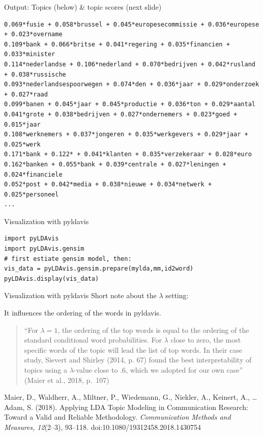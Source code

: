 \documentclass{beamer}
\begin{document}
\begin{frame}[fragile]{Output: Topics (below) \& topic scores (next slide)}
\begin{lstlisting}
0.069*fusie + 0.058*brussel + 0.045*europesecommissie + 0.036*europese + 0.023*overname
0.109*bank + 0.066*britse + 0.041*regering + 0.035*financien + 0.033*minister
0.114*nederlandse + 0.106*nederland + 0.070*bedrijven + 0.042*rusland + 0.038*russische
0.093*nederlandsespoorwegen + 0.074*den + 0.036*jaar + 0.029*onderzoek + 0.027*raad
0.099*banen + 0.045*jaar + 0.045*productie + 0.036*ton + 0.029*aantal
0.041*grote + 0.038*bedrijven + 0.027*ondernemers + 0.023*goed + 0.015*jaar
0.108*werknemers + 0.037*jongeren + 0.035*werkgevers + 0.029*jaar + 0.025*werk
0.171*bank + 0.122* + 0.041*klanten + 0.035*verzekeraar + 0.028*euro
0.162*banken + 0.055*bank + 0.039*centrale + 0.027*leningen + 0.024*financiele
0.052*post + 0.042*media + 0.038*nieuwe + 0.034*netwerk + 0.025*personeel
...
\end{lstlisting}
\end{frame}


\begin{frame}[plain]
\end{frame}




\begin{frame}[fragile]{Visualization with pyldavis}
\begin{lstlisting}
import pyLDAvis
import pyLDAvis.gensim
# first estiate gensim model, then:
vis_data = pyLDAvis.gensim.prepare(mylda,mm,id2word)
pyLDAvis.display(vis_data)
\end{lstlisting}
\end{frame}

\begin{frame}{Visualization with pyldavis}
Short note about the $\lambda$ setting:

It influences the ordering of the words in pyldavis.

\begin{quote}
``For $\lambda = 1$, the ordering of the top words is equal to the ordering of the standard conditional word probabilities. For $\lambda$ close to zero, the most specific words of the topic will lead the list of top words. In their case study, Sievert and Shirley (2014, p. 67) found the best interpretability of topics using a  $\lambda$-value close to .6, which we adopted for our own case'' (Maier et al., 2018, p.~107)
\end{quote}


\tiny{Maier, D., Waldherr, A., Miltner, P., Wiedemann, G., Niekler, A., Keinert, A., \ldots Adam, S. (2018). Applying LDA Topic Modeling in Communication Research: Toward a Valid and Reliable Methodology. \textit{Communication Methods and Measures, 12}(2--3), 93--118. doi:10.1080/19312458.2018.1430754}
\end{frame}
\end{document}

